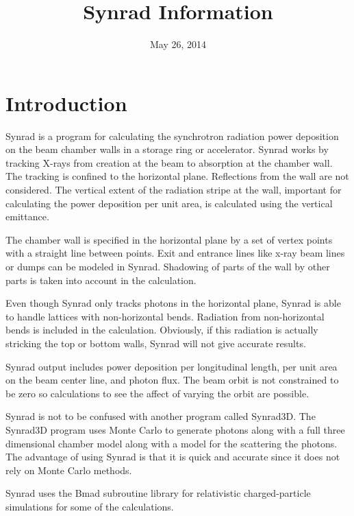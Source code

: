 \documentclass[11pt]{article}
\title{ Synrad Information}
\author{}
\date{May 26, 2014}
\begin{document}
\maketitle

\section{Introduction} 

Synrad is a program for calculating the synchrotron radiation power
deposition on the beam chamber walls in a storage ring or
accelerator. Synrad works by tracking X-rays from creation at the
beam to absorption at the chamber wall. The tracking is confined to
the horizontal plane. Reflections from the wall are not considered.
The vertical extent of the radiation stripe at the wall, important for
calculating the power deposition per unit area, is calculated using
the vertical emittance.

The chamber wall is specified in the horizontal plane by a set of
vertex points with a straight line between points. Exit and entrance
lines like x-ray beam lines or dumps can be modeled in Synrad.
Shadowing of parts of the wall by other parts is taken into account in
the calculation.

Even though Synrad only tracks photons in the horizontal plane, Synrad
is able to handle lattices with non-horizontal bends. Radiation from
non-horizontal bends is included in the calculation. Obviously, if
this radiation is actually stricking the top or bottom walls, Synrad
will not give accurate results.

Synrad output includes power deposition per longitudinal length, per
unit area on the beam center line, and photon flux. The beam orbit is
not constrained to be zero so calculations to see the affect of
varying the orbit are possible.

Synrad is not to be confused with another program called Synrad3D.
The Synrad3D program uses Monte Carlo to generate photons along with a
full three dimensional chamber model along with a model for the
scattering the photons. The advantage of using Synrad is that it is
quick and accurate since it does not rely on Monte Carlo methods.

Synrad uses the Bmad subroutine library for relativistic
charged-particle simulations\cite{b:bmad} for some of the
calculations. 

\end{document}

